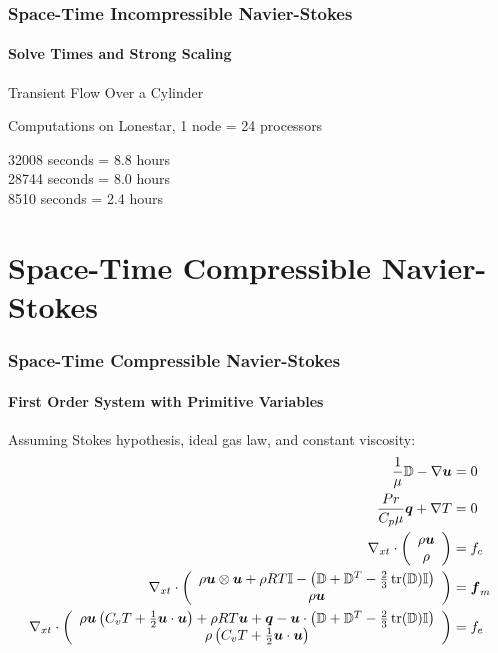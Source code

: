 \documentclass[18pt,xcolor=table]{beamer}
\begin{document}
\begin{frame}
\frametitle{Space-Time Incompressible Navier-Stokes}
\framesubtitle{Solve Times and Strong Scaling}  %
\begin{block}{Transient Flow Over a Cylinder}
\end{block}
Computations on Lonestar, 1 node = 24 processors

32008 seconds = 8.8 hours\\ 28744 seconds = 8.0 hours\\ \hspace{1ex}8510 seconds = 2.4 hours
\end{frame}



\section{Space-Time Compressible Navier-Stokes}
\begin{frame}[t]
\frametitle{Space-Time Compressible Navier-Stokes}
\framesubtitle{First Order System with Primitive Variables}
Assuming Stokes hypothesis, ideal gas law, and constant viscosity:
\begin{align*}
  \frac{1}{\mu}\mathbb{D}-\nabla\boldsymbol u&=0\\
  \frac{Pr}{C_p\mu}\boldsymbol q+\nabla T&=0\\
  \nabla_{xt}\cdot\left( \begin{array}{c} \rho\boldsymbol u\\ \rho\\ \end{array} \right)&=f_c\\
  \nabla_{xt}\cdot\left( \begin{array}{c} \rho\boldsymbol u\otimes\boldsymbol u+\rho RT\mathbb{I}-\left( \mathbb{D}+\mathbb{D}^T-\frac{2}{3}\operatorname*{tr}(\mathbb{D})\mathbb{I} \right)\\ \rho\boldsymbol u\\ \end{array} \right)&=\boldsymbol f_m\\
  \nabla_{xt}\cdot\left( \begin{array}{c} \rho\boldsymbol u\left( C_v T+\frac{1}{2}\boldsymbol u\cdot\boldsymbol u \right)+\rho RT\boldsymbol u+\boldsymbol q-\boldsymbol u\cdot\left( \mathbb{D}+\mathbb{D}^T-\frac{2}{3}\operatorname*{tr}(\mathbb{D})\mathbb{I} \right)\\ \rho\left( C_v T+\frac{1}{2}\boldsymbol u\cdot\boldsymbol u \right)\\ \end{array} \right)&=f_e
\end{align*}
\end{frame}
\end{document}
